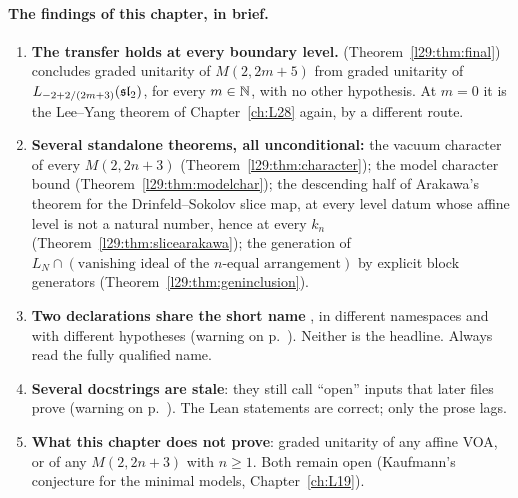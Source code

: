 \paragraph{The findings of this chapter, in brief.}
\begin{enumerate}
\item \textbf{The transfer holds at every boundary level.} 
  (Theorem~\ref{l29:thm:final}) concludes graded unitarity of $M(2,2m+5)$ from graded unitarity of
  $L_{-2+2/(2m+3)}(\mathfrak{sl}_2)$, for every $m\in{\mathbb{N}}$, with no other hypothesis. At $m=0$ it is the Lee--Yang
  theorem of Chapter~\ref{ch:L28} again, by a different route.
\item \textbf{Several standalone theorems, all unconditional:} the vacuum character of every $M(2,2n+3)$
  (Theorem~\ref{l29:thm:character}); the model character bound (Theorem~\ref{l29:thm:modelchar}); the descending half
  of Arakawa's theorem for the Drinfeld--Sokolov slice map, at every level datum whose affine level is not a natural number,
  hence at every $k_n$ (Theorem~\ref{l29:thm:slicearakawa}); the generation of $L_N\cap(\text{vanishing ideal of the $n$-equal arrangement})$ by explicit
  block generators (Theorem~\ref{l29:thm:geninclusion}).
\item \textbf{Two declarations share the short name} , in different
  namespaces and with different hypotheses (warning on p.~\pageref{l29:warn:clash}). Neither is the headline. Always read the
  fully qualified name.
\item \textbf{Several docstrings are stale}: they still call ``open'' inputs that later files prove
  (warning on p.~\pageref{l29:warn:stale}). The Lean statements are correct; only the prose lags.
\item \textbf{What this chapter does not prove}: graded unitarity of any affine VOA, or of any $M(2,2n+3)$ with
  $n\ge1$. Both remain open (Kaufmann's conjecture for the minimal models, Chapter~\ref{ch:L19}).
\end{enumerate}

